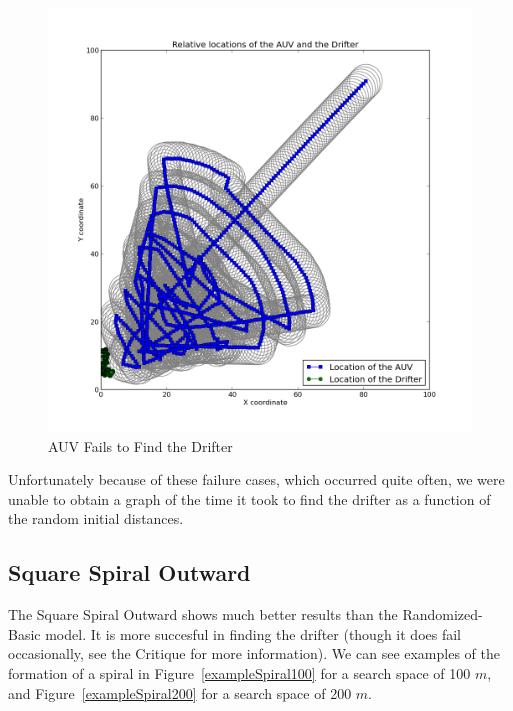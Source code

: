 \documentclass[a4paper, 11pt]{article} %
\begin{document}
\begin{figure}[H]
	\begin{center}
		\includegraphics[scale=0.30]{basic_4.png}
	\end{center}
\caption{AUV Fails to Find the Drifter \label{failureToLocate}}
\end{figure}

\noindent Unfortunately because of these failure cases, which occurred quite often, we were unable to obtain a graph of the time it took to find the drifter as a function of the random initial distances.

\subsection*{Square Spiral Outward}

The Square Spiral Outward shows much better results than the Randomized-Basic model. It is more succesful in finding the drifter (though it does fail occasionally, see the Critique for more information). We can see examples of the formation of a spiral in Figure~\ref{exampleSpiral100} for a search space of 100 $m$, and Figure~\ref{exampleSpiral200} for a search space of 200 $m$.  
\end{document}
